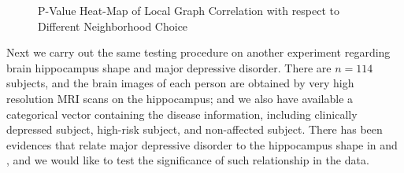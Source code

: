 \documentclass[11pt]{article}
\begin{document}
\begin{figure}[htbp]
\centering
{}
\hfil
\centering
{}
\hfil
\centering
{}
\caption{P-Value Heat-Map of Local Graph Correlation with respect to Different Neighborhood Choice}
\label{figReal}
\end{figure}

Next we carry out the same testing procedure on another experiment regarding brain hippocampus shape and major depressive disorder. There are $n=114$ subjects, and the brain images of each person are obtained by very high resolution MRI scans on the hippocampus; and we also have available a categorical vector containing the disease information, including clinically depressed subject, high-risk subject, and non-affected subject. There has been evidences that relate major depressive disorder to the hippocampus shape in \cite{ParkEtAl2011} and \cite{PosenerEtAl2003}, and we would like to test the significance of such relationship in the data. 
\end{document}
